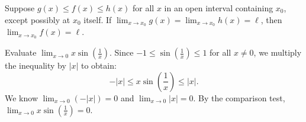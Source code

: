 \documentclass[../calculus.tex]{subfiles}
\begin{document}
\begin{theorem}
    \begin{shaded*}
        Suppose $g(x) \le f(x) \le h(x)$ for all $x$ in an open interval containing $x_0$, except possibly at $x_0$ itself. If $\lim_{x\to x_0}g(x) = \lim_{x\to x_0}h(x) = \ell$, then $\lim_{x\to x_0}f(x) = \ell$.
    \end{shaded*}
\end{theorem}

\begin{example}
    Evaluate $\lim_{x\to 0} x \sin\left(\frac{1}{x}\right)$. 
    Since $-1 \le \sin\left(\frac{1}{x}\right) \le 1$ for all $x \neq 0$, we multiply the inequality by $|x|$ to obtain:
    \[-|x| \le x \sin\left(\frac{1}{x}\right) \le |x|.\]
    We know $\lim_{x\to 0} (-|x|) = 0$ and $\lim_{x\to 0} |x| = 0$. By the comparison test, $\lim_{x\to 0} x \sin\left(\frac{1}{x}\right) = 0$.
\end{example}
\end{document}
